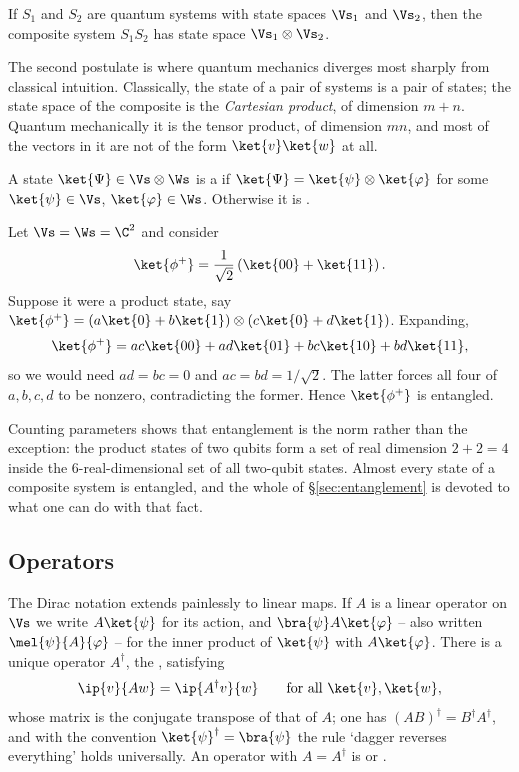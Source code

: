 \begin{axiom}
	If $S_1$ and $S_2$ are quantum systems with state spaces $\Vs_1$ and $\Vs_2$, then the composite system $S_1S_2$ has state space $\Vs_1 \otimes \Vs_2$.
\end{axiom}

The second postulate is where quantum mechanics diverges most sharply from classical intuition. Classically, the state of a pair of systems is a pair of states; the state space of the composite is the \emph{Cartesian product}, of dimension $m + n$. Quantum mechanically it is the tensor product, of dimension $mn$, and most of the vectors in it are not of the form $\ket{v}\ket{w}$ at all.

\begin{definition}
	A state $\ket{\Psi} \in \Vs \otimes \Ws$ is a  if $\ket{\Psi} = \ket{\psi}\otimes\ket{\varphi}$ for some $\ket{\psi} \in \Vs$, $\ket{\varphi} \in \Ws$. Otherwise it is .
\end{definition}

\begin{example}
	Let $\Vs = \Ws = \C^2$ and consider
	$$\ket{\phi^+} = \frac{1}{\sqrt2}\left(\ket{00} + \ket{11}\right).$$
	Suppose it were a product state, say $\ket{\phi^+} = (a\ket{0}+b\ket{1})\otimes(c\ket{0}+d\ket{1})$. Expanding,
	$$\ket{\phi^+} = ac\ket{00} + ad\ket{01} + bc\ket{10} + bd\ket{11},$$
	so we would need $ad = bc = 0$ and $ac = bd = 1/\sqrt2$. The latter forces all four of $a,b,c,d$ to be nonzero, contradicting the former. Hence $\ket{\phi^+}$ is entangled.
\end{example}

Counting parameters shows that entanglement is the norm rather than the exception: the product states of two qubits form a set of real dimension $2 + 2 = 4$ inside the $6$-real-dimensional set of all two-qubit states. Almost every state of a composite system is entangled, and the whole of \S\ref{sec:entanglement} is devoted to what one can do with that fact.

\subsection{Operators}

The Dirac notation extends painlessly to linear maps. If $A$ is a linear operator on $\Vs$ we write $A\ket{\psi}$ for its action, and $\bra{\psi}A\ket{\varphi}$ -- also written $\mel{\psi}{A}{\varphi}$ -- for the inner product of $\ket{\psi}$ with $A\ket{\varphi}$. There is a unique operator $A^\dagger$, the , satisfying
$$\ip{v}{Aw} = \ip{A^\dagger v}{w} \qquad \text{for all } \ket{v},\ket{w},$$
whose matrix is the conjugate transpose of that of $A$; one has $(AB)^\dagger = B^\dagger A^\dagger$, and with the convention $\ket{\psi}^\dagger = \bra{\psi}$ the rule `dagger reverses everything' holds universally. An operator with $A = A^\dagger$ is  or .

